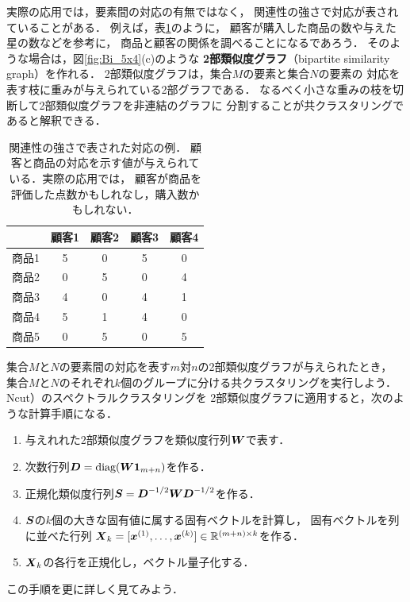 実際の応用では，要素間の対応の有無ではなく，
関連性の強さで対応が表されていることがある．
例えば，表\ref{tab:stars}のように，
顧客が購入した商品の数や与えた星の数などを参考に，
商品と顧客の関係を調べることになるであろう．
そのような場合は，図\ref{fig:Bi_5x4}(c)のような
{\bf 2部類似度グラフ}（bipartite similarity graph）を作れる．
2部類似度グラフは，集合$M$の要素と集合$N$の要素の
対応を表す枝に重みが与えられている2部グラフである．
なるべく小さな重みの枝を切断して2部類似度グラフを非連結のグラフに
分割することが共クラスタリングであると解釈できる．


\begin{table}[h]
\begin{center}
\caption{関連性の強さで表された対応の例．
顧客と商品の対応を示す値が与えられている．実際の応用では，
顧客が商品を評価した点数かもしれなし，購入数かもしれない．}
\label{tab:stars}
\vspace{\baselineskip}
\begin{tabular}{l|cccc}
        & 顧客1 & 顧客2 & 顧客3 & 顧客4\\
\hline
商品1  & 5 & 0 & 5 & 0 \\
商品2  & 0 & 5 & 0 & 4 \\
商品3  & 4 & 0 & 4 & 1 \\
商品4  & 5 & 1 & 4 & 0 \\
商品5  & 0 & 5 & 0 & 5
\end{tabular}
\end{center}
\end{table}




集合$M$と$N$の要素間の対応を表す$m$対$n$の2部類似度グラフが与えられたとき，
集合$M$と$N$のそれぞれ$k$個のグループに分ける共クラスタリングを実行しよう．
Ncut\cite{Shi00,Yu03}）のスペクトラルクラスタリングを
2部類似度グラフに適用すると，次のような計算手順になる．
\begin{enumerate}
\item
与えれれた2部類似度グラフを類似度行列$\mbox{\boldmath $W$}$で表す．
\item
次数行列$\mbox{\boldmath $D$}=\mathop{\textrm{diag}}\nolimits(\mbox{\boldmath $W$}\mbox{\boldmath $1$}_{m+n})$を作る．
\item
正規化類似度行列$\mbox{\boldmath $S$}=\mbox{\boldmath $D$}^{-1/2}\mbox{\boldmath $W$}\mbox{\boldmath $D$}^{-1/2}$を作る．
\item
$\mbox{\boldmath $S$}$の$k$個の大きな固有値に属する固有ベクトルを計算し，
固有ベクトルを列に並べた行列
$\mbox{\boldmath $X$}_k=[\mbox{\boldmath $x$}^{(1)},\dots,\mbox{\boldmath $x$}^{(k)}]\in\mathbb{R}^{(m+n)\times k}$を作る．
\item
$\mbox{\boldmath $X$}_k$の各行を正規化し，ベクトル量子化する．
\end{enumerate}
この手順を更に詳しく見てみよう．


